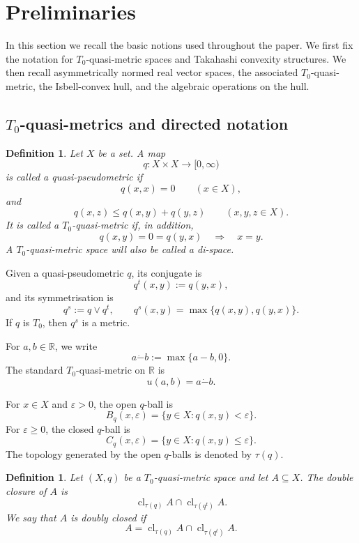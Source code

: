 \documentclass[preprint,12pt]{elsarticle}
\numberwithin{equation}{section}
\newtheorem{definition}[theorem]{Definition}
\newcommand{\cl}{\operatorname{cl}}
\begin{document}
\section{Preliminaries}\label{sec:prelim}

In this section we recall the basic notions used throughout the paper.  We
first fix the notation for \(T_{0}\)-quasi-metric spaces and Takahashi
convexity structures.  We then recall asymmetrically normed real vector spaces,
the associated \(T_{0}\)-quasi-metric, the Isbell-convex hull, and the
algebraic operations on the hull.

\subsection{\texorpdfstring{\(T_{0}\)}{T0}-quasi-metrics and directed notation}
\label{subsec:qmetric}

\begin{definition}\label{def:qpm}
Let \(X\) be a set.  A map
\[
q:X\times X\longrightarrow [0,\infty)
\]
is called a \emph{quasi-pseudometric} if
\[
q(x,x)=0\qquad (x\in X),
\]
and
\[
q(x,z)\le q(x,y)+q(y,z)
\qquad (x,y,z\in X).
\]
It is called a \emph{\(T_{0}\)-quasi-metric} if, in addition,
\[
q(x,y)=0=q(y,x)\quad\Longrightarrow\quad x=y.
\]
A \(T_{0}\)-quasi-metric space will also be called a \emph{di-space}.
\end{definition}

Given a quasi-pseudometric \(q\), its conjugate is
\[
q^{t}(x,y):=q(y,x),
\]
and its symmetrisation is
\[
q^{s}:=q\vee q^{t},\qquad
q^{s}(x,y)=\max\{q(x,y),q(y,x)\}.
\]
If \(q\) is \(T_{0}\), then \(q^{s}\) is a metric.

For \(a,b\in\mathbb R\), we write
\[
a\dot{-}b:=\max\{a-b,0\}.
\]
The standard \(T_{0}\)-quasi-metric on \(\mathbb R\) is
\[
u(a,b)=a\dot{-}b.
\]

For \(x\in X\) and \(\varepsilon>0\), the open \(q\)-ball is
\[
B_q(x,\varepsilon)=\{y\in X:q(x,y)<\varepsilon\}.
\]
For \(\varepsilon\ge 0\), the closed \(q\)-ball is
\[
C_q(x,\varepsilon)=\{y\in X:q(x,y)\le \varepsilon\}.
\]
The topology generated by the open \(q\)-balls is denoted by \(\tau(q)\).

\begin{definition}\label{def:doubleclosure}
Let \((X,q)\) be a \(T_{0}\)-quasi-metric space and let \(A\subseteq X\).
The \emph{double closure} of \(A\) is
\[
\cl_{\tau(q)}A\cap \cl_{\tau(q^{t})}A.
\]
We say that \(A\) is \emph{doubly closed} if
\[
A=\cl_{\tau(q)}A\cap \cl_{\tau(q^{t})}A.
\]
\end{definition}
\end{document}

